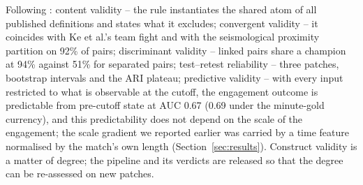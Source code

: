 Following \cite{jacobs2021measurement}: content validity -- the rule instantiates the
shared atom of all published definitions and states what it excludes; convergent validity
-- it coincides with Ke et al.'s team fight and with the seismological proximity
partition on 92\% of pairs; discriminant validity -- linked pairs share a champion at 94\%
against 51\% for separated pairs; test--retest reliability -- three patches, bootstrap
intervals and the ARI plateau; predictive validity -- with every input restricted to what is
observable at the cutoff, the engagement outcome is predictable from pre-cutoff state at
AUC 0.67 (0.69 under the minute-gold currency), and this predictability does not depend
on the scale of the engagement; the scale gradient we reported earlier was carried by a
time feature normalised by the match's own length (Section~\ref{sec:results}). Construct validity is a
matter of degree; the pipeline and its verdicts are released so that the degree can be
re-assessed on new patches.
